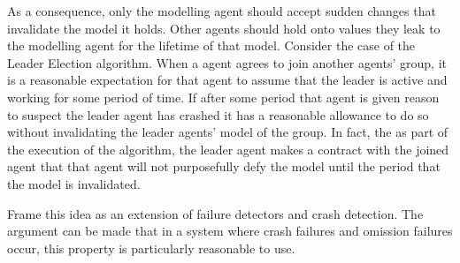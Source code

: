 As a consequence, only the modelling agent should accept sudden changes that invalidate the model it holds. Other agents should hold onto values they leak to the modelling agent for the lifetime of that model. Consider the case of the Leader Election algorithm. When a agent agrees to join another agents' group, it is a reasonable expectation for that agent to assume that the leader is active and working for some period of time. If after some period that agent is given reason to suspect the leader agent has crashed it has a reasonable allowance to do so without invalidating the leader agents' model of the group. In fact, the as part of the execution of the algorithm, the leader agent makes a contract with the joined agent that that agent will not purposefully defy the model until the period that the model is invalidated.

Frame this idea as an extension of failure detectors and crash detection. The argument can be made that in a system where crash failures and omission failures occur, this property is particularly reasonable to use.
